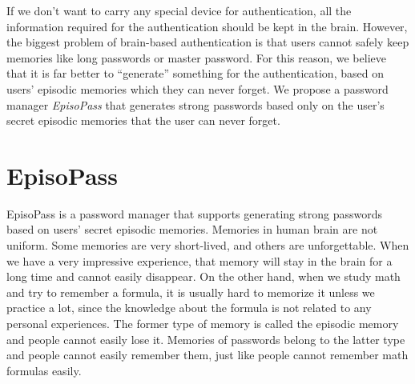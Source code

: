 \documentclass[runningheads,a4paper]{llncs}
\begin{document}
If we don't want to carry any special device for authentication,
all the information required for the authentication should be
kept in the brain.
%
However, the biggest problem of brain-based authentication is that
users cannot safely keep memories like long passwords or master password.
For this reason, we believe that
it is far better to ``generate'' something for the authentication,
based on users' episodic memories which they can never forget.
%
%
We propose a password manager \textit{EpisoPass} that generates strong passwords
based only on the user's secret episodic memories that the user can never forget.


\section{EpisoPass}

EpisoPass is a password manager that supports generating
strong passwords based on users' secret episodic memories.
%
%
Memories in human brain are not uniform.
Some memories are very short-lived, and others are unforgettable.
When we have a very impressive experience,
that memory will stay in the brain for a long time and
cannot easily disappear.
On the other hand, when we study math and try to remember a formula,
it is usually hard to memorize it unless we practice a lot,
since the knowledge about the formula is not related to
any personal experiences.
The former type of memory is called the episodic memory and
people cannot easily lose it.
Memories of passwords belong to the latter type and
people cannot easily remember them, just like people cannot
remember math formulas easily.
%
\end{document}

